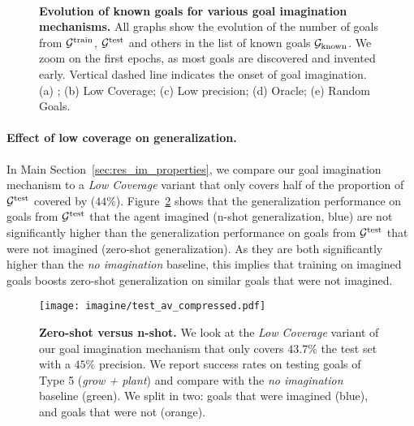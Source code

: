 \begin{figure}[!h]
      \centering
       \\
      \caption{\textbf{Evolution of known goals for various goal imagination mechanisms.} All graphs show the evolution of the number of goals from $\mathcal{G}^{\text{train}}$, $\mathcal{G}^{\text{test}}$ and others in the list of known goals $\mathcal{G}_\text{known}$. We zoom on the first epochs, as most goals are discovered and invented early. Vertical dashed line indicates the onset of goal imagination. (a) \CGH; (b) Low Coverage; (c) Low precision; (d) Oracle; (e) Random Goals. \label{fig:suppl_known_goals}}
\end{figure} 

\newpage
\paragraph{Effect of low coverage on generalization.}
In Main Section~\ref{sec:res_im_properties}, we compare our goal imagination mechanism to a \textit{Low Coverage} variant that only covers half of the proportion of $\mathcal{G}^{\text{test}}$ covered by \CGH ($44\%$). Figure~\ref{fig:suppl_halftc} shows that the generalization performance on goals from $\mathcal{G}^{\text{test}}$ that the agent imagined (n-shot generalization, blue) are not significantly higher than the generalization performance on goals from $\mathcal{G}^{\text{test}}$ that were not imagined (zero-shot generalization). As they are both significantly higher than the \textit{no imagination} baseline, this implies that training on imagined goals boosts zero-shot generalization on similar goals that were not imagined. 


\begin{figure}[!h]
      \centering
      \texttt{[image: imagine/test\_av\_compressed.pdf]}
      \caption{\textbf{Zero-shot versus n-shot.} We look at the \textit{Low Coverage} variant of our goal imagination mechanism that only covers $43.7\%$ the test set with a $45\%$ precision. We report success rates on testing goals of Type 5 (\textit{grow + plant}) and compare with the \textit{no imagination} baseline (green). We split in two: goals that were imagined (blue), and goals that were not (orange). \label{fig:suppl_halftc}}
\end{figure} 

